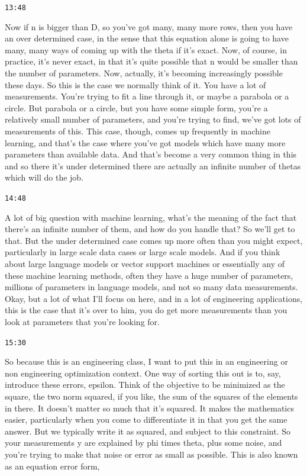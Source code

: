 \documentclass[11pt,a4paper]{article}
\newcommand{\timestamp}[1]{%
  \par\vspace{0.35em}%
  \noindent\colorbox{timestampback}{\textcolor{timestampblue}{\small\texttt{#1}}}%
  \par\vspace{0.2em}%
}
\begin{document}
\timestamp{13:48}

Now if n is bigger than D, so you've got many, many more rows, then you have an over determined case, in the sense that this equation alone is going to have many, many ways of coming up with the theta if it's exact. Now, of course, in practice, it's never exact, in that it's quite possible that n would be smaller than the number of parameters. Now, actually, it's becoming increasingly possible these days. So this is the case we normally think of it. You have a lot of measurements. You're trying to fit a line through it, or maybe a parabola or a circle. But parabola or a circle, but you have some simple form, you're a relatively small number of parameters, and you're trying to find, we've got lots of measurements of this. This case, though, comes up frequently in machine learning, and that's the case where you've got models which have many more parameters than available data. And that's become a very common thing in this and so there it's under determined there are actually an infinite number of thetas which will do the job.



\timestamp{14:48}

A lot of big question with machine learning, what's the meaning of the fact that there's an infinite number of them, and how do you handle that? So we'll get to that. But the under determined case comes up more often than you might expect, particularly in large scale data cases or large scale models. And if you think about large language models or vector support machines or essentially any of these machine learning methods, often they have a huge number of parameters, millions of parameters in language models, and not so many data measurements. Okay, but a lot of what I'll focus on here, and in a lot of engineering applications, this is the case that it's over to him, you do get more measurements than you look at parameters that you're looking for.



\timestamp{15:30}

So because this is an engineering class, I want to put this in an engineering or non engineering optimization context. One way of sorting this out is to, say, introduce these errors, epsilon. Think of the objective to be minimized as the square, the two norm squared, if you like, the sum of the squares of the elements in there. It doesn't matter so much that it's squared. It makes the mathematics easier, particularly when you come to differentiate it in that you get the same answer. But we typically write it as squared, and subject to this constraint. So your measurements y are explained by phi times theta, plus some noise, and you're trying to make that noise or error as small as possible. This is also known as an equation error form,
\end{document}
